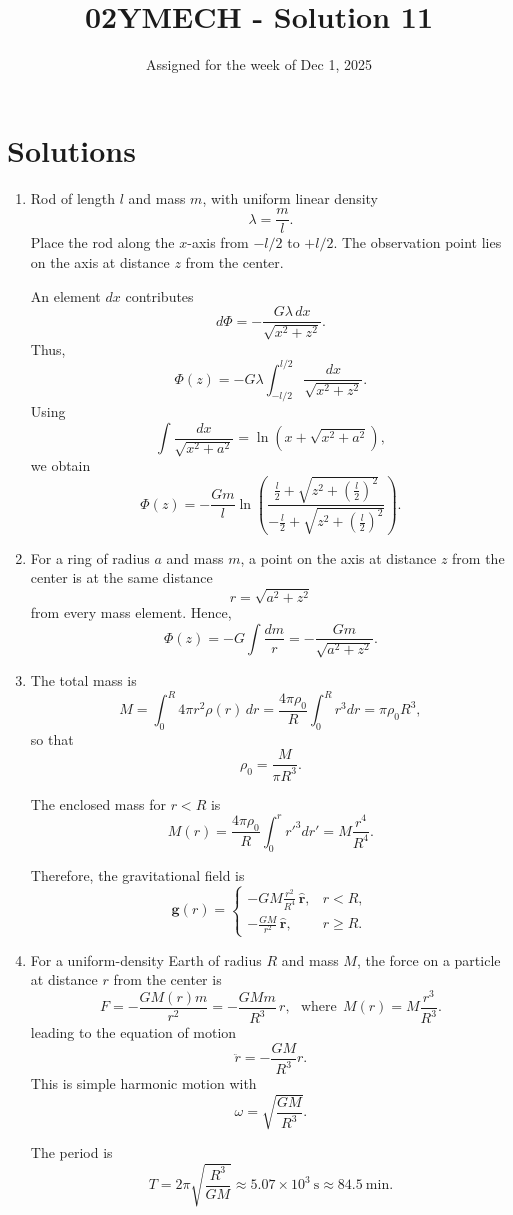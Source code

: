 \documentclass[12pt]{article}
\title{02YMECH - Solution 11}
\date{Assigned for the week of Dec 1, 2025}
\author{}
\begin{document}
\maketitle

\section*{Solutions}

\begin{enumerate}

\item Rod of length $l$ and mass $m$, with uniform linear density
\[
\lambda=\frac{m}{l}.
\]
Place the rod along the $x$-axis from $-l/2$ to $+l/2$. The observation point lies on the axis at distance $z$ from the center.

An element $dx$ contributes
\[
d\Phi = -\frac{G\lambda\,dx}{\sqrt{x^2+z^2}}.
\]
Thus,
\[
\Phi(z)=-G\lambda\int_{-l/2}^{l/2}\frac{dx}{\sqrt{x^2+z^2}}.
\]
Using
\[
\int \frac{dx}{\sqrt{x^2+a^2}}
=\ln\!\left(x+\sqrt{x^2+a^2}\right),
\]
we obtain
\[
\Phi(z)=-\frac{Gm}{l}
\ln\!\left(
\frac{\frac{l}{2}+\sqrt{z^2+\left(\frac{l}{2}\right)^2}}
{-\frac{l}{2}+\sqrt{z^2+\left(\frac{l}{2}\right)^2}}
\right).
\]

\item For a ring of radius $a$ and mass $m$, a point on the axis at distance $z$ from the center is at the same distance
\[
r=\sqrt{a^2+z^2}
\]
from every mass element. Hence,
\[
\Phi(z)=-G\int\frac{dm}{r}
=-\frac{Gm}{\sqrt{a^2+z^2}}.
\]

\item The total mass is
\[
M=\int_0^R 4\pi r^2\rho(r)\,dr
=\frac{4\pi\rho_0}{R}\int_0^R r^3dr
=\pi\rho_0 R^3,
\]
so that
\[
\rho_0=\frac{M}{\pi R^3}.
\]

The enclosed mass for $r<R$ is
\[
M(r)=\frac{4\pi\rho_0}{R}\int_0^r r'^3dr'
= M\frac{r^4}{R^4}.
\]

Therefore, the gravitational field is
\[
\mathbf g(r)=
\begin{cases}
-\displaystyle G M \frac{r^2}{R^4}\,\hat{\mathbf r},
& r<R,\\[1.2ex]
-\displaystyle \frac{GM}{r^2}\,\hat{\mathbf r},
& r\ge R.
\end{cases}
\]

\item For a uniform-density Earth of radius $R$ and mass $M$, the force on a particle at distance $r$ from the center is
\[
F=-\frac{GM(r)m}{r^2}
=-\frac{GMm}{R^3}\,r, ~~~ \text{where} ~~M(r)=M\frac{r^3}{R^3}.
\]
leading to the equation of motion
\[
\ddot r=-\frac{GM}{R^3}r.
\]
This is simple harmonic motion with
\[
\omega=\sqrt{\frac{GM}{R^3}}.
\]

The period is
\[
T=2\pi\sqrt{\frac{R^3}{GM}}
\approx 5.07\times10^3\ \text{s}
\approx 84.5\ \text{min}.
\]

\end{enumerate}
\end{document}

